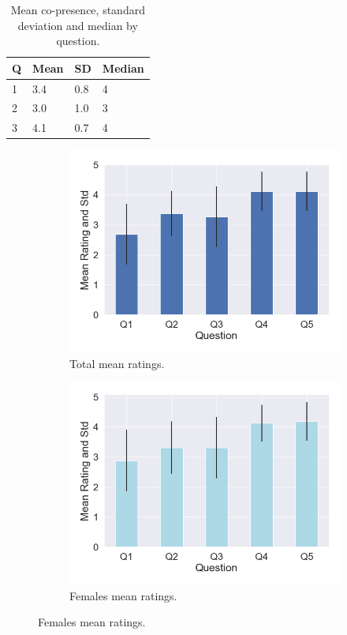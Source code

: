 \begin{table}
\centering
\begin{tabular}{|llll|}
\hline
Q & Mean & SD & Median \\
\hline
1 &  3.4 & 0.8&4\\  
2 &  3.0 & 1.0&3\\ 
3 &  4.1 & 0.7&4\\ 
\hline
\end{tabular}
\caption{Mean co-presence, standard deviation and median by question.}
\label{tbl:copres}
\end{table}
 
\begin{figure}[H]

\begin{subfigure}[b]{\textwidth}
 \centering
 \includegraphics[scale=0.5]{Files/Plots/presence_mean_ratings.png}
 \caption{Total mean ratings. }
 \label{fig:presAllMean}
 \end{subfigure}

\begin{subfigure}[b]{\textwidth}
 \centering
 \includegraphics[scale=0.5]{Files/Plots/presence_mean_ratings_f.png}
 \caption{Females mean ratings.}
 \label{fig:presFemale}
 \end{subfigure}


\end{figure}
